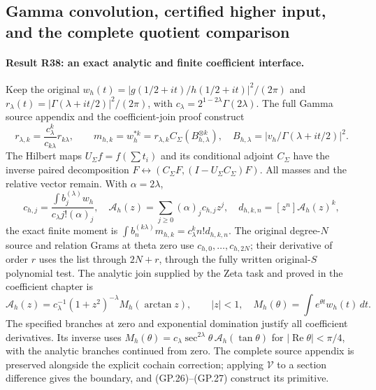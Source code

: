 \subsection{Gamma convolution, certified higher input, and the complete quotient comparison}

\paragraph{Result R38: an exact analytic and finite coefficient interface.}
Keep the original $w_h(t)=|g(1/2+it)/h(1/2+it)|^2/(2\pi)$ and
$r_\lambda(t)=|\Gamma(\lambda+it/2)|^2/(2\pi)$, with
$c_\lambda=2^{1-2\lambda}\Gamma(2\lambda)$. The full Gamma source
appendix and the coefficient-join proof construct
\[
 r_{\lambda,k}=\frac{c_\lambda^k}{c_{k\lambda}}r_{k\lambda},\qquad
 m_{h,k}=w_h^{*k}=r_{\lambda,k}C_\Sigma(B_{h,\lambda}^{\otimes k}),
 \quad B_{h,\lambda}=|v_h/\Gamma(\lambda+it/2)|^2.
\]
The Hilbert maps $U_\Sigma f=f(\sum t_i)$ and its conditional adjoint
$C_\Sigma$ have the inverse paired decomposition
$F\leftrightarrow(C_\Sigma F,(I-U_\Sigma C_\Sigma)F)$.
All masses and the relative vector remain. With $\alpha=2\lambda$,
\[
 c_{h,j}=\frac{\int b_j^{(\lambda)}w_h}{c_\lambda j!(\alpha)_j},\quad
 \mathcal A_h(z)=\sum_{j\ge0}(\alpha)_jc_{h,j}z^j,\quad
 d_{h,k,n}=[z^n]\mathcal A_h(z)^k,
\]
the exact finite moment is
$\int b_n^{(k\lambda)}m_{h,k}=c_\lambda^kn!d_{h,k,n}$.
The original degree-$N$ source and relation Grams at theta zero use
$c_{h,0},\ldots,c_{h,2N}$; their derivative of order $r$ uses the
list through $2N+r$, through the fully written original-$S$ polynomial
test. The analytic join supplied by the Zeta task and proved in the
coefficient chapter is
\[
 \mathcal A_h(z)=c_\lambda^{-1}(1+z^2)^{-\lambda}
                   M_h(\arctan z),\qquad |z|<1,
 \quad M_h(\theta)=\int e^{\theta t}w_h(t)\,dt.
\]
The specified branches at zero and exponential domination justify
all coefficient derivatives. Its inverse uses
$M_h(\theta)=c_\lambda\sec^{2\lambda}\theta\,
\mathcal A_h(\tan\theta)$ for $|\operatorname{Re}\theta|<\pi/4$,
with the analytic branches continued from zero.
The complete source appendix is preserved alongside the explicit
cochain correction; applying $\mathcal V$ to a section difference
gives the boundary, and (GP.26)--(GP.27) construct its primitive.

